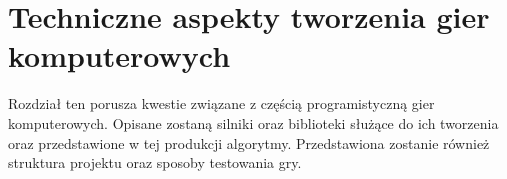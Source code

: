 \documentclass[12pt,a4paper,oneside]{book}
\theoremstyle{definition}
\numberwithin{equation}{chapter}
\begin{document}

\chapter{Techniczne aspekty tworzenia gier komputerowych}
\par Rozdział ten porusza kwestie związane z częścią programistyczną gier komputerowych. Opisane zostaną silniki oraz biblioteki służące do ich tworzenia oraz przedstawione w tej produkcji algorytmy. Przedstawiona zostanie również struktura projektu oraz sposoby testowania gry.
\end{document}
